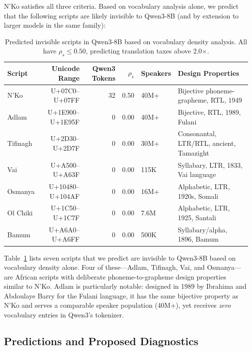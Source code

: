 \documentclass[11pt]{article}
\begin{document}
N'Ko satisfies all three criteria.
Based on vocabulary analysis alone, we predict that the following scripts are likely invisible to Qwen3-8B (and by extension to larger models in the same family):

\begin{table}[t]
\centering
\small
\begin{tabular}{lrrrlp{5cm}}
\toprule
\textbf{Script} & \textbf{Unicode Range} & \textbf{Qwen3 Tokens} & \textbf{$\rho_s$} & \textbf{Speakers} & \textbf{Design Properties} \\
\midrule
N'Ko & U+07C0--U+07FF & 32 & 0.50 & 40M+ & Bijective phoneme-grapheme, RTL, 1949 \\
Adlam & U+1E900--U+1E95F & 0 & 0.00 & 40M+ & Bijective, RTL, 1989, Fulani \\
Tifinagh & U+2D30--U+2D7F & 0 & 0.00 & 30M+ & Consonantal, LTR/RTL, ancient, Tamazight \\
Vai & U+A500--U+A63F & 0 & 0.00 & 115K & Syllabary, LTR, 1833, Vai language \\
Osmanya & U+10480--U+104AF & 0 & 0.00 & 16M+ & Alphabetic, LTR, 1920s, Somali \\
Ol Chiki & U+1C50--U+1C7F & 0 & 0.00 & 7.6M & Alphabetic, LTR, 1925, Santali \\
Bamum & U+A6A0--U+A6FF & 0 & 0.00 & 500K & Syllabary/alpha, 1896, Bamum \\
\bottomrule
\end{tabular}
\caption{Predicted invisible scripts in Qwen3-8B based on vocabulary density analysis. All have $\rho_s \leq 0.50$, predicting translation taxes above 2.0$\times$.}
\label{tab:invisible-scripts}
\end{table}

Table~\ref{tab:invisible-scripts} lists seven scripts that we predict are invisible to Qwen3-8B based on vocabulary density alone.
Four of these---Adlam, Tifinagh, Vai, and Osmanya---are African scripts with deliberate phoneme-to-grapheme design properties similar to N'Ko.
Adlam is particularly notable: designed in 1989 by Ibrahima and Abdoulaye Barry for the Fulani language, it has the same bijective property as N'Ko and serves a comparable speaker population (40M+), yet receives \emph{zero} vocabulary entries in Qwen3's tokenizer.

\subsection{Predictions and Proposed Diagnostics}
\end{document}
